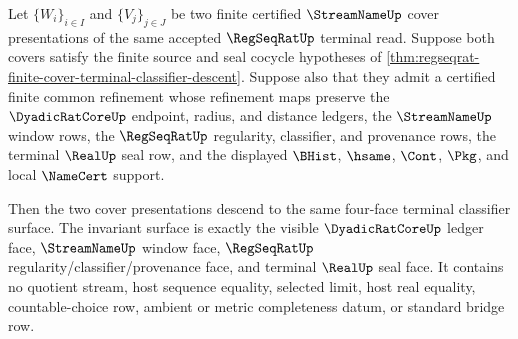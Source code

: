 \begin{theorem}
\label{thm:regseqrat-finite-cover-terminal-refinement-invariance}
Let $\{W_i\}_{i \in I}$ and $\{V_j\}_{j \in J}$ be two finite certified
$\StreamNameUp$ cover presentations of the same accepted $\RegSeqRatUp$
terminal read. Suppose both covers satisfy the finite source and seal cocycle
hypotheses of
\autoref{thm:regseqrat-finite-cover-terminal-classifier-descent}. Suppose
also that they admit a certified finite common refinement whose refinement
maps preserve the $\DyadicRatCoreUp$ endpoint, radius, and distance ledgers,
the $\StreamNameUp$ window rows, the $\RegSeqRatUp$ regularity, classifier,
and provenance rows, the terminal $\RealUp$ seal row, and the displayed
$\BHist$, $\hsame$, $\Cont$, $\Pkg$, and local $\NameCert$ support.

Then the two cover presentations descend to the same four-face terminal
classifier surface. The invariant surface is exactly the visible
$\DyadicRatCoreUp$ ledger face, $\StreamNameUp$ window face, $\RegSeqRatUp$
regularity/classifier/provenance face, and terminal $\RealUp$ seal face. It
contains no quotient stream, host sequence equality, selected limit, host real
equality, countable-choice row, ambient or metric completeness datum, or
standard bridge row.
\end{theorem}
